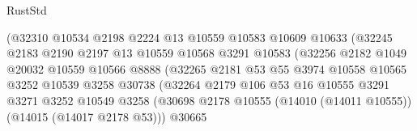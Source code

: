 \begin{lexlean}{RustStd}
\begin{coremodule}
                                    (@32310
                                      @10534
                                      @2198
                                      @2224
                                      @13
                                      @10559
                                      @10583
                                      @10609
                                      @10633
                                      (@32245
                                        @2183
                                        @2190
                                        @2197
                                        @13
                                        @10559
                                        @10568
                                        @3291
                                        @10583
                                        (@32256
                                          @2182
                                          @1049
                                          @20032
                                          @10559
                                          @10566
                                          @8888
                                          (@32265
                                            @2181
                                            @53
                                            @55
                                            @3974
                                            @10558
                                            @10565
                                            @3252
                                            @10539
                                            @3258
                                            @30738
                                            (@32264
                                              @2179
                                              @106
                                              @53
                                              @16
                                              @10555
                                              @3291
                                              @3271
                                              @3252
                                              @10549
                                              @3258
                                              (@30698
                                                @2178
                                                @10555
                                                (@14010 (@14011 @10555))
                                                (@14015 (@14017 @2178 @53)))
                                              @30665

\end{coremodule}
\end{lexlean}
